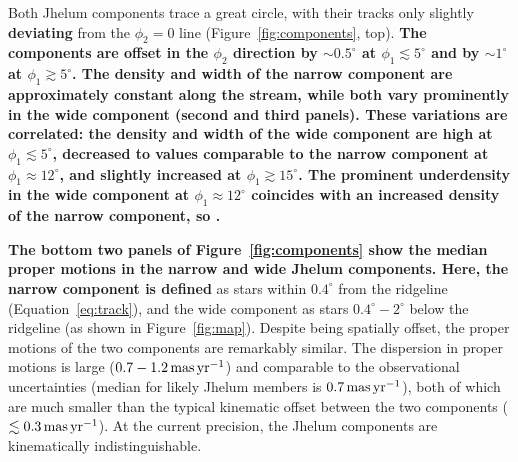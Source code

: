 \documentclass[twocolumn]{aastex62}
\newcommand{\changes}[1]{{\textbf{#1}}}
\begin{document}
Both Jhelum components trace a great circle, with their tracks only slightly \changes{deviating} from the $\phi_2=0$ line (Figure~\ref{fig:components}, top).
\changes{
The components are offset in the $\phi_2$ direction by $\sim0.5^\circ$ at $\phi_1\lesssim5^\circ$ and by $\sim1^\circ$ at $\phi_1\gtrsim5^\circ$.
The density and width of the narrow component are approximately constant along the stream, while both vary prominently in the wide component (second and third panels).
These variations are correlated: the density and width of the wide component are high at $\phi_1\lesssim5^\circ$, decreased to values comparable to the narrow component at $\phi_1\approx12^\circ$, and slightly increased at $\phi_1\gtrsim15^\circ$.
The prominent underdensity in the wide component at $\phi_1\approx12^\circ$ coincides with an increased density of the narrow component, so .
}

\changes{The bottom two panels of Figure~\ref{fig:components} show the median proper motions in the narrow and wide Jhelum components.
Here, the narrow component is defined} as stars within $0.4^\circ$ from the ridgeline (Equation~\ref{eq:track}), and the wide component as stars $0.4^\circ-2^\circ$ below the ridgeline (as shown in Figure~\ref{fig:map}).
Despite being spatially offset, the proper motions of the two components are remarkably similar.
The dispersion in proper motions is large ($0.7-1.2\,\rm mas\,yr^{-1}$) and comparable to the observational uncertainties (median for likely Jhelum members is $0.7\rm\, mas\, yr^{-1}$), both of which are much smaller than the typical kinematic offset between the two components ($\lesssim0.3\,\rm mas\,yr^{-1}$).
At the current precision, the Jhelum components are kinematically indistinguishable.
\end{document}
